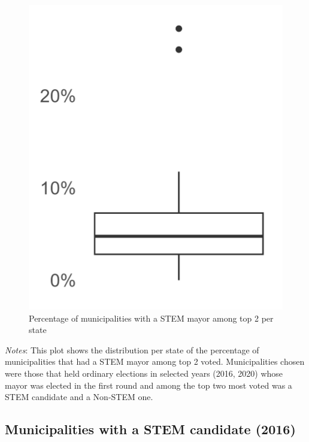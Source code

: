 \documentclass[
  letterpaper,
  DIV=11,
  numbers=noendperiod]{scrartcl}
\begin{document}
\begin{figure}[H]

\caption{Percentage of municipalities with a STEM mayor among top 2 per
state}

{\centering \includegraphics{outputs/figures/sumstats_boxplot.png}

}

\end{figure}%

\emph{Notes}: This plot shows the distribution per state of the
percentage of municipalities that had a STEM mayor among top 2 voted.
Municipalities chosen were those that held ordinary elections in
selected years (2016, 2020) whose mayor was elected in the first round
and among the top two most voted was a STEM candidate and a Non-STEM
one.

\subsection{Municipalities with a STEM candidate
(2016)}\label{municipalities-with-a-stem-candidate-2016}
\end{document}
